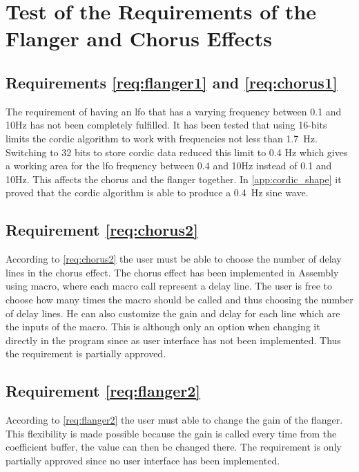 \newpage
\section{Test of the Requirements of the Flanger and Chorus Effects}

\subsection{Requirements \ref{req:flanger1} and \ref{req:chorus1}}

The requirement of having an \gls{lfo} that has a varying frequency between 0.1 and 10Hz has not been completely fulfilled. It has been tested that using 16-bits limits the \gls{cordic} algorithm to work with frequencies not less than \SI{1.7}{\hertz}. Switching to 32 bits to store \gls{cordic} data reduced this limit to 0.4 Hz which gives a working area for the \gls{lfo} frequency between 0.4 and 10Hz instead of 0.1 and 10Hz. This affects the chorus and the flanger together. In \autoref{app:cordic_shape} it proved that the \gls{cordic} algorithm is able to produce a \SI{0.4}{\hertz} sine wave.

\subsection{Requirement \ref{req:chorus2}}

According to \autoref{req:chorus2} the user must be able to choose the number of delay lines in the chorus effect. The chorus effect has been implemented in Assembly using macro, where each macro call represent a delay line. The user is free to choose how many times the macro should be called and thus choosing the number of delay lines. He can also customize the gain and delay for each line which are the inputs of the macro. This is although only an option when changing it directly in the program since as user interface has not been implemented. Thus the requirement is partially approved.

\subsection{Requirement \ref{req:flanger2}}

According to \autoref{req:flanger2} the user must able to change the gain of the flanger. This flexibility is made possible because the gain is called every time from the coefficient buffer, the value can then be changed there. The requirement is only partially approved since no user interface has been implemented. 





